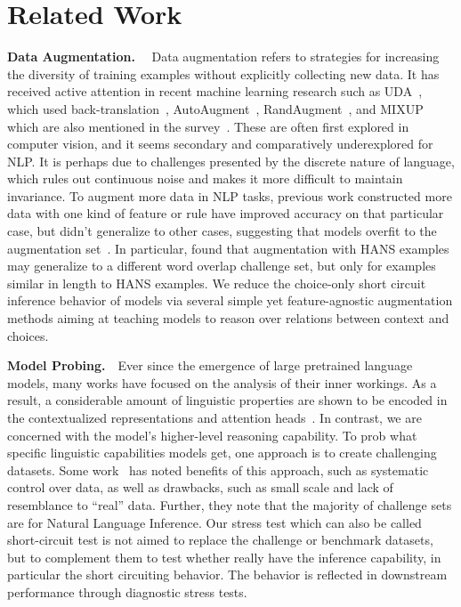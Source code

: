 \section{Related Work}


\textbf{Data Augmentation.}~~
Data augmentation refers to strategies for increasing the diversity 
of training examples without explicitly collecting new data. 
It has received active attention in recent machine learning research such as UDA~\cite{xie2020unsupervised}, 
which used back-translation~\cite{sennrich2016improving}, AutoAugment~\cite{cubuk2018autoaugment}, 
RandAugment~\cite{cubuk2020randaugment}, 
and MIXUP~\cite{zhang2017mixup} which are also mentioned in the survey~\cite{feng2021survey}. 
These are often first explored in computer vision, 
and it seems secondary and 
comparatively underexplored for NLP. 
It is perhaps due to challenges presented by the discrete nature 
of language, which rules out continuous noise and makes it more difficult to maintain invariance.
To augment more data in NLP tasks, previous work constructed more data 
with one kind of feature or rule have improved 
accuracy on that particular case, but didn't generalize to 
other cases, suggesting that models overfit to the 
augmentation set~\cite{Iyyer2018,Liu2019a}. 
In particular, \cite{mccoy2019right} found that 
augmentation with HANS examples may generalize 
to a different word overlap challenge set, 
but only for examples similar in length to HANS examples. 
We reduce the choice-only short circuit inference 
behavior of models via several simple yet feature-agnostic  
augmentation methods aiming at teaching models to reason over relations between context and choices. 

\textbf{Model Probing.}~~Ever since the emergence of large pretrained language models, 
many works have focused on the analysis of their inner workings. 
As a result, a considerable amount of linguistic properties are shown to be encoded 
in the contextualized representations and attention 
heads~\cite{goldberg2019,clark2019,liu-etal-2019-linguistic,tenny2019}. 
In contrast, we are concerned with the model's higher-level reasoning capability. 
To prob what specific linguistic capabilities models get, 
one approach is to create challenging datasets. 
Some work~\cite{belinkov2019analysis} has 
noted benefits of this approach,
such as systematic control over data, as well as
drawbacks, such as small scale and lack of resemblance
to ``real'' data. Further, they note that the
majority of challenge sets are for Natural Language
Inference. Our stress test which can also be called short-circuit test is not 
aimed to replace the 
challenge or benchmark datasets, but to complement
them to test whether really have the inference capability, 
in particular the short circuiting behavior. 
The behavior is reflected in downstream performance through diagnostic stress tests.

